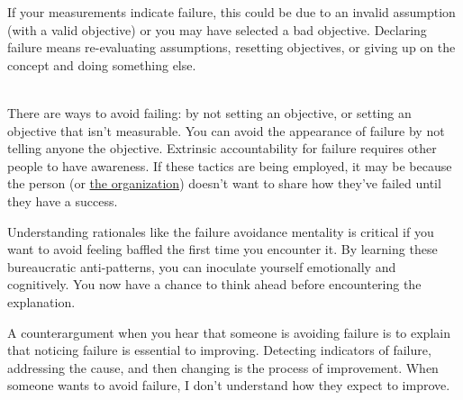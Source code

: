 If your measurements indicate failure, this could be due to an invalid assumption (with a valid objective) or you may have selected a bad objective. Declaring failure means re-evaluating assumptions, resetting objectives, or giving up on the concept and doing something else.

\ \\

There are ways to avoid failing: by not setting an objective, or setting an objective that isn't measurable. You can avoid the appearance of failure by not telling anyone the objective. Extrinsic accountability for failure requires other people to have awareness. If these tactics are being employed, it may be because the person (or
\hyperref[sec:org-failure-and-success]{the organization}) doesn't want to share how they've failed until they have a success. 

Understanding rationales like the failure avoidance mentality is critical if you want to avoid feeling baffled the first time you encounter it. By learning these bureaucratic anti-patterns, you can inoculate yourself emotionally and cognitively. You now have a chance to think ahead before encountering the explanation.

A counterargument when you hear that someone is avoiding failure is to explain that noticing failure is essential to improving. Detecting indicators of failure, addressing the cause, and then changing is the process of improvement. When someone wants to avoid failure, I don't understand how they expect to improve. 

